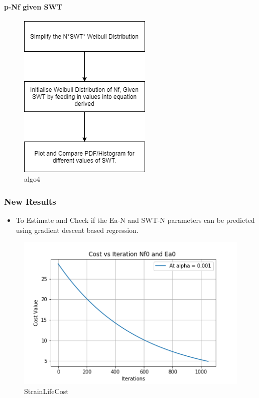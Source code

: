 \documentclass[11pt]{article}
\providecommand{\tightlist}{%
      \setlength{\itemsep}{0pt}\setlength{\parskip}{0pt}}
\begin{document}
\hypertarget{p-nf-given-swt}{%
\paragraph{p-Nf given SWT}\label{p-nf-given-swt}}

\begin{figure}
\centering
\includegraphics{images/algo4.png}
\caption{algo4}
\end{figure}

\hypertarget{new-results}{%
\subsubsection{New Results}\label{new-results}}

\begin{itemize}
\tightlist
\item
  To Estimate and Check if the Ea-N and SWT-N parameters can be
  predicted using gradient descent based regression.
\end{itemize}

\begin{figure}
\centering
\includegraphics{images/costviterEa.png}
\caption{StrainLifeCost}
\end{figure}
\end{document}
